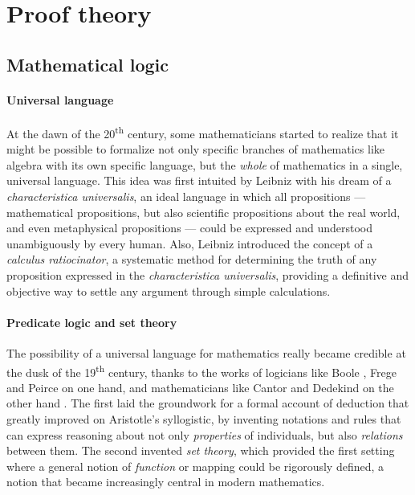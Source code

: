 \section{Proof theory}

\subsection{Mathematical logic}

\paragraph{Universal language}

At the dawn of the 20\textsuperscript{th} century, some mathematicians started
to realize that it might be possible to formalize not only specific branches of
mathematics like algebra with its own specific language, but the \emph{whole} of
mathematics in a single, universal language. This idea was first intuited by
Leibniz with his dream of a \textit{characteristica universalis}, an ideal
language in which all propositions --- mathematical propositions, but also
scientific propositions about the real world, and even metaphysical propositions
--- could be expressed and understood unambiguously by every human. Also,
Leibniz introduced the concept of a \textit{calculus ratiocinator}, a systematic
method for determining the truth of any proposition expressed in the
\textit{characteristica universalis}, providing a definitive and objective way
to settle any argument through simple calculations.

\paragraph{Predicate logic and set theory}

The possibility of a universal language for mathematics really became credible
at the dusk of the 19\textsuperscript{th} century, thanks to the works of
logicians like Boole , Frege  and
Peirce  on one hand, and mathematicians like
Cantor and Dedekind on the other hand
. The first laid the groundwork
for a formal account of deduction that greatly improved on Aristotle's
syllogistic, by inventing notations and rules that can express reasoning about
not only \emph{properties} of individuals, but also \emph{relations} between
them. The second invented \emph{set theory}, which provided the first setting
where a general notion of \emph{function} or mapping could be rigorously
defined, a notion that became increasingly central in modern mathematics.

